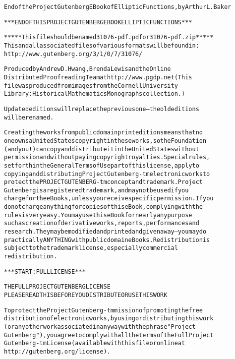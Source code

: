 \documentclass[12pt,leqno]{book}[2005/09/16]
\renewcommand{\cleardoublepage}{\clearpage}
\newenvironment{PGtext}{%
\begin{alltt}
\fontsize{9.2}{10.5}\ttfamily\selectfont}%
{\end{alltt}}
\begin{document}

\cleardoublepage

\backmatter
{}
{}
{}

\begin{PGtext}
End of the Project Gutenberg EBook of Elliptic Functions, by Arthur L. Baker

*** END OF THIS PROJECT GUTENBERG EBOOK ELLIPTIC FUNCTIONS ***

***** This file should be named 31076-pdf.pdf or 31076-pdf.zip *****
This and all associated files of various formats will be found in:
        http://www.gutenberg.org/3/1/0/7/31076/

Produced by Andrew D. Hwang, Brenda Lewis and the Online
Distributed Proofreading Team at http://www.pgdp.net (This
file was produced from images from the Cornell University
Library: Historical Mathematics Monographs collection.)


Updated editions will replace the previous one--the old editions
will be renamed.

Creating the works from public domain print editions means that no
one owns a United States copyright in these works, so the Foundation
(and you!) can copy and distribute it in the United States without
permission and without paying copyright royalties.  Special rules,
set forth in the General Terms of Use part of this license, apply to
copying and distributing Project Gutenberg-tm electronic works to
protect the PROJECT GUTENBERG-tm concept and trademark.  Project
Gutenberg is a registered trademark, and may not be used if you
charge for the eBooks, unless you receive specific permission.  If you
do not charge anything for copies of this eBook, complying with the
rules is very easy.  You may use this eBook for nearly any purpose
such as creation of derivative works, reports, performances and
research.  They may be modified and printed and given away--you may do
practically ANYTHING with public domain eBooks.  Redistribution is
subject to the trademark license, especially commercial
redistribution.



*** START: FULL LICENSE ***

THE FULL PROJECT GUTENBERG LICENSE
PLEASE READ THIS BEFORE YOU DISTRIBUTE OR USE THIS WORK

To protect the Project Gutenberg-tm mission of promoting the free
distribution of electronic works, by using or distributing this work
(or any other work associated in any way with the phrase "Project
Gutenberg"), you agree to comply with all the terms of the Full Project
Gutenberg-tm License (available with this file or online at
http://gutenberg.org/license).



\end{PGtext}
\end{document}
